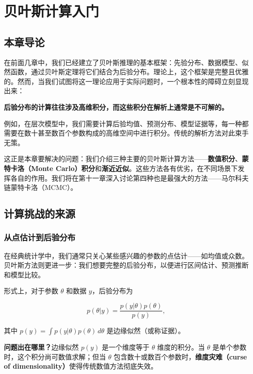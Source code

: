 
\chapter{贝叶斯计算入门}

\section{本章导论}

在前面几章中，我们已经建立了贝叶斯推理的基本框架：先验分布、数据模型、似然函数，通过贝叶斯定理将它们结合为后验分布。理论上，这个框架是完整且优雅的。然而，当我们试图将这一理论应用于实际问题时，一个根本性的障碍立刻显现出来：

\textbf{后验分布的计算往往涉及高维积分，而这些积分在解析上通常是不可解的。}

例如，在层次模型中，我们需要计算后验均值、预测分布、模型证据等，每一种都需要在数十甚至数百个参数构成的高维空间中进行积分。传统的解析方法对此束手无策。

这正是本章要解决的问题：我们介绍三种主要的贝叶斯计算方法——\textbf{数值积分}、\textbf{蒙特卡洛（Monte Carlo）积分}和\textbf{渐近近似}。这些方法各有优劣，在不同场景下发挥各自的作用。我们将在第十一章深入讨论第四种也是最强大的方法——马尔科夫链蒙特卡洛（MCMC）。

\section{计算挑战的来源}

\subsection{从点估计到后验分布}

在经典统计学中，我们通常只关心某些感兴趣的参数的点估计——如均值或众数。贝叶斯方法则更进一步：我们想要完整的后验分布，以便进行区间估计、预测推断和模型比较。

形式上，对于参数 $\theta$ 和数据 $y$，后验分布为

\[
p(\theta | y) = \frac{p(y | \theta) p(\theta)}{p(y)},
\]

其中 $p(y) = \int p(y | \theta) p(\theta) \, d\theta$ 是边缘似然（或称证据）。

\textbf{问题出在哪里？}边缘似然 $p(y)$ 是一个维度等于 $\theta$ 维度的积分。当 $\theta$ 是单个参数时，这个积分尚可数值求解；但当 $\theta$ 包含数十或数百个参数时，\textbf{维度灾难（curse of dimensionality）}使得传统数值方法彻底失效。

